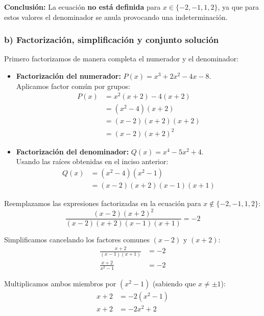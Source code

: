 \documentclass[11pt,a4paper]{article}
\begin{document}
\noindent \textbf{Conclusión:} La ecuación \textbf{no está definida} para $x \in \{-2, -1, 1, 2\}$, ya que para estos valores el denominador se anula provocando una indeterminación.

\subsubsection*{b) Factorización, simplificación y conjunto solución}

Primero factorizamos de manera completa el numerador y el denominador:

\begin{itemize}
    \item \textbf{Factorización del numerador:} $P(x) = x^3 + 2x^2 - 4x - 8$. \\
    Aplicamos factor común por grupos:
    \begin{align*}
        P(x) &= x^2(x + 2) - 4(x + 2) \\
             &= (x^2 - 4)(x + 2) \\
             &= (x - 2)(x + 2)(x + 2) \\
             &= (x - 2)(x + 2)^2
    \end{align*}

    \item \textbf{Factorización del denominador:} $Q(x) = x^4 - 5x^2 + 4$. \\
    Usando las raíces obtenidas en el inciso anterior:
    \begin{align*}
        Q(x) &= (x^2 - 4)(x^2 - 1) \\
             &= (x - 2)(x + 2)(x - 1)(x + 1)
    \end{align*}
\end{itemize}

Reemplazamos las expresiones factorizadas en la ecuación para $x \notin \{-2, -1, 1, 2\}$:
\begin{equation*}
    \frac{(x - 2)(x + 2)^2}{(x - 2)(x + 2)(x - 1)(x + 1)} = -2
\end{equation*}

Simplificamos cancelando los factores comunes $(x - 2)$ y $(x + 2)$:
\begin{align*}
    \frac{x + 2}{(x - 1)(x + 1)} &= -2 \\
    \frac{x + 2}{x^2 - 1} &= -2
\end{align*}

Multiplicamos ambos miembros por $(x^2 - 1)$ (sabiendo que $x \neq \pm 1$):
\begin{align*}
    x + 2 &= -2(x^2 - 1) \\
    x + 2 &= -2x^2 + 2
\end{align*}
\end{document}

